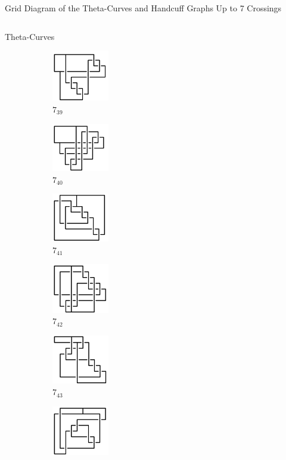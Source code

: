 \documentclass[final]{beamer}
\begin{document}
\begin{frame}[t]
\begin{alertblock}{Grid Diagram of the Theta-Curves and Handcuff Graphs Up to 7 Crossings}
\begin{columns}[t]
\begin{column}{0.7\textwidth}
\begin{alertblock}{Theta-Curves}
\begin{figure}
\begin{subfigure}{0.075\textwidth}
    \includegraphics[width=2.5cm]{../Midterm_Poster/grid_diagram/theta_7_39.png}
    \caption{$7_{39}$} 
    \end{subfigure}
    \begin{subfigure}{0.075\textwidth}
    \includegraphics[width=2.5cm]{../Midterm_Poster/grid_diagram/theta_7_40.png}
    \caption{$7_{40}$} 
    \end{subfigure}
    \begin{subfigure}{0.075\textwidth}
    \includegraphics[width=2.5cm]{../Midterm_Poster/grid_diagram/theta_7_41.png}
    \caption{$7_{41}$} 
    \end{subfigure}
    \begin{subfigure}{0.075\textwidth}
    \includegraphics[width=2.5cm]{../Midterm_Poster/grid_diagram/theta_7_42.png}
    \caption{$7_{42}$} 
    \end{subfigure}
    \begin{subfigure}{0.075\textwidth}
    \includegraphics[width=2.5cm]{../Midterm_Poster/grid_diagram/theta_7_43.png}
    \caption{$7_{43}$} 
    \end{subfigure}
    \begin{subfigure}{0.075\textwidth}
    \includegraphics[width=2.5cm]{../Midterm_Poster/grid_diagram/theta_7_44.png}

\end{subfigure}
\end{figure}
\end{alertblock}
\end{column}
\end{columns}
\end{alertblock}
\end{frame}
\end{document}
